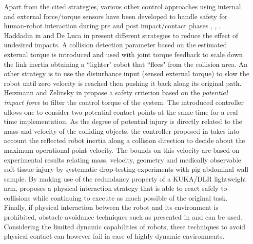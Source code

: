 Apart from the cited strategies, various other control  approaches using internal and external force/torque sensors have been developed to handle safety for human-robot interaction during pre and post impact/contact phases \cite{ebert2002safe}, \cite{lumelsky1993real}, \cite{ikuta2003safety}. Haddadin in \cite{haddadin2008collision} and De Luca in \cite{de2006collision} present different strategies to reduce the effect of undesired impacts. A collision detection parameter based on the estimated external torque is introduced and used with joint torque feedback to scale down the link inertia obtaining a ``lighter" robot that ``flees" from the collision area. An other strategy is to use the disturbance input (sensed external torque) to slow the robot until zero velocity is reached then pushing it back along its original path.  Heizmann and Zelinsky in \cite{heinzmann2003quantitative} propose a safety criterion based on the \textit{potential impact force} to filter the control torque of the system. The introduced controller allows one to  consider two potential contact points at the same time for a real-time implementation.
As the degree of potential injury is directly related to the mass and velocity of the colliding objects, the controller proposed in \cite{haddadin2012truly} takes into account the reflected robot inertia along a collision direction to decide about the maximum operational point velocity. The bounds on this velocity are based on experimental results relating mass, velocity, geometry and medically observable soft tissue injury by systematic drop-testing experiments with pig abdominal wall sample.
By making use of the redundancy property of a KUKA/DLR lightweight arm, \cite{de2008exploiting} proposes a physical interaction strategy that is able to react safely to collisions while continuing to execute as much possible of the original task. Finally, if physical interaction between the robot and its environment is prohibited, obstacle avoidance techniques such as presented in \cite{flacco2012depth} and \cite{de2012integrated} can be used. Considering the limited dynamic capabilities of robots, these techniques to avoid physical contact can however fail in case of highly dynamic environments.
%
%
